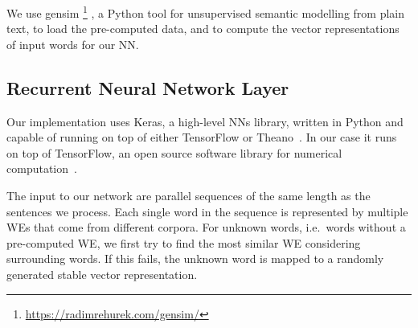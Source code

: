 \documentclass[11pt,a4paper]{article}
\begin{document}

We use gensim%
\footnote{\url{https://radimrehurek.com/gensim/}}%
, a Python tool for unsupervised semantic modelling from plain text, to load
the pre-computed data, and to compute the vector representations of
input words for our NN.

\subsection{Recurrent Neural Network Layer} %

Our implementation uses Keras, a high-level NNs library, written in Python and
capable of running on top of either TensorFlow or Theano~\cite{chollet2015}. 
In our case it runs on top of TensorFlow, an open source software library for numerical computation~\cite{tensorflow2016}.

The input to our network are parallel sequences of the same length as the sentences we
process.
Each single word in the sequence is represented by multiple WEs that come from different corpora. %
For unknown words, i.e.~words without a pre-computed WE, we first try to
find the most similar WE considering %
surrounding words.  
If this fails, the unknown word is mapped to a randomly generated stable vector
representation.
\end{document}
